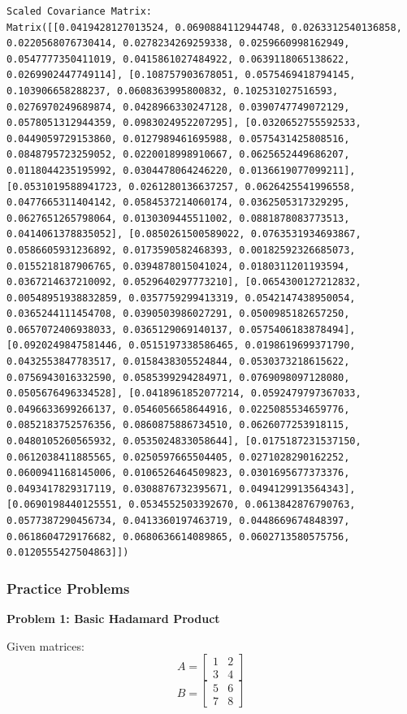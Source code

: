 \documentclass[
  letterpaper,
  DIV=11,
  numbers=noendperiod]{scrreprt}
\theoremstyle{plain}
\theoremstyle{definition}
\theoremstyle{remark}
\begin{document}
\begin{verbatim}
Scaled Covariance Matrix:
Matrix([[0.0419428127013524, 0.0690884112944748, 0.0263312540136858, 0.0220568076730414, 0.0278234269259338, 0.0259660998162949, 0.0547777350411019, 0.0415861027484922, 0.0639118065138622, 0.0269902447749114], [0.108757903678051, 0.0575469418794145, 0.103906658288237, 0.0608363995800832, 0.102531027516593, 0.0276970249689874, 0.0428966330247128, 0.0390747749072129, 0.0578051312944359, 0.0983024952207295], [0.0320652755592533, 0.0449059729153860, 0.0127989461695988, 0.0575431425808516, 0.0848795723259052, 0.0220018998910667, 0.0625652449686207, 0.0118044235195992, 0.0304478064246220, 0.0136619077099211], [0.0531019588941723, 0.0261280136637257, 0.0626425541996558, 0.0477665311404142, 0.0584537214060174, 0.0362505317329295, 0.0627651265798064, 0.0130309445511002, 0.0881878083773513, 0.0414061378835052], [0.0850261500589022, 0.0763531934693867, 0.0586605931236892, 0.0173590582468393, 0.00182592326685073, 0.0155218187906765, 0.0394878015041024, 0.0180311201193594, 0.0367214637210092, 0.0529640297773210], [0.0654300127212832, 0.00548951938832859, 0.0357759299413319, 0.0542147438950054, 0.0365244111454708, 0.0390503986027291, 0.0500985182657250, 0.0657072406938033, 0.0365129069140137, 0.0575406183878494], [0.0920249847581446, 0.0515197338586465, 0.0198619699371790, 0.0432553847783517, 0.0158438305524844, 0.0530373218615622, 0.0756943016332590, 0.0585399294284971, 0.0769098097128080, 0.0505676496334528], [0.0418961852077214, 0.0592479797367033, 0.0496633699266137, 0.0546056658644916, 0.0225085534659776, 0.0852183752576356, 0.0860875886734510, 0.0626077253918115, 0.0480105260565932, 0.0535024833058644], [0.0175187231537150, 0.0612038411885565, 0.0250597665504405, 0.0271028290162252, 0.0600941168145006, 0.0106526464509823, 0.0301695677373376, 0.0493417829317119, 0.0308876732395671, 0.0494129913564343], [0.0690198440125551, 0.0534552503392670, 0.0613842876790763, 0.0577387290456734, 0.0413360197463719, 0.0448669674848397, 0.0618604729176682, 0.0680636614089865, 0.0602713580575756, 0.0120555427504863]])
\end{verbatim}

\subsubsection{Practice Problems}\label{practice-problems-1}

\textbf{Problem 1: Basic Hadamard Product}

Given matrices: \[A=\begin{bmatrix}1&2\\3&4\end{bmatrix}\]
\[B=\begin{bmatrix}5&6\\7&8\end{bmatrix}\]
\end{document}
